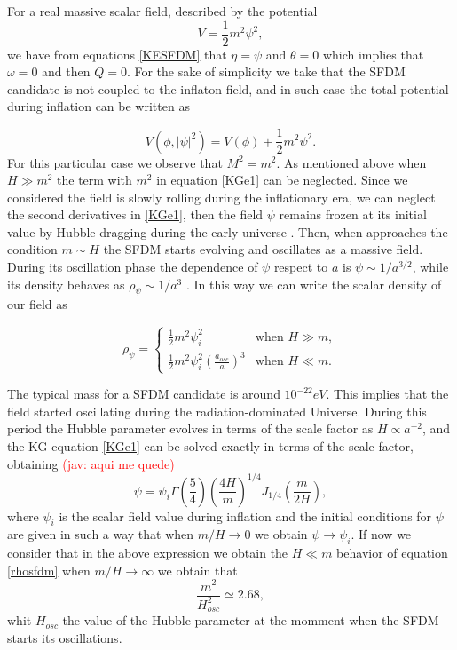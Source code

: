 \documentclass[amssymb,twocolumn,prd,nofootinbib,showpacs]{revtex4-1}
\newcommand{\jav}[1]{\textcolor{red}{(jav: #1)}}
\begin{document}
For a real massive scalar field, described by the potential 
\begin{equation}
V = \frac{1}{2}m^2\psi^2,
\end{equation}
we have from equations \eqref{KESFDM} that $\eta=\psi$ and $\theta=0$ which implies that $\omega=0$ and then $Q = 0$. 
For the sake of simplicity we take that the SFDM candidate is not coupled to the inflaton field, and in such case 
the total potential during inflation can be written as 

\begin{equation}\label{potential_massive}
V(\phi,|\psi|^2)=V(\phi)+\frac{1}{2}m^2\psi^2.
\end{equation}
For this particular case we observe that  $M^2=m^2$. As mentioned above when $H\gg m^2$ the term with $m^2$ 
in equation \eqref{KGe1} can be neglected. Since we considered the field is slowly rolling during the inflationary era, 
we can neglect the second derivatives in \eqref{KGe1}, then the field $\psi$ remains frozen at its initial value by 
Hubble dragging during the early universe \cite{curvatonatractor}. 
%
Then, when approaches the condition $m\sim H$ the SFDM starts evolving and oscillates as a massive field. 
During its oscillation phase the dependence of $\psi$ respect to $a$ is $\psi\sim 1/a^{3/2}$, while its density 
behaves as $\rho_{\psi}\sim 1/a^3$  \cite{SFphi41,SFphi42}. In this way we can write the scalar density 
of our field as

\begin{equation}\label{rhosfdm}
\rho_\psi = \left\lbrace\begin{array}{ll}
\frac{1}{2}m^2\psi_i^2 & \text{when }H\gg m, \\
\frac{1}{2}m^2\psi_i^2\left(\frac{a_{osc}}{a}\right)^3 & \text{when }H\ll m.
\end{array}\right .
\end{equation}

The typical mass for a SFDM candidate is around $10^{-22} eV$. 
This implies that the field started oscillating during the radiation-dominated Universe. 
During this period the Hubble parameter evolves in terms of the scale factor as $H\propto a^{-2}$, 
and the KG equation \eqref{KGe1} can be solved exactly in terms of the scale factor,  obtaining
\jav{aqui me quede}
\begin{equation}
\psi = \psi_i\Gamma\left(\frac{5}{4}\right)\left(\frac{4H}{m}\right)^{1/4}J_{1/4}\left(\frac{m}{2H}\right),
\end{equation}
where $\psi_i$ is the scalar field value during inflation and the initial conditions for $\psi$ are given in 
such a way that when $m/H\rightarrow 0$ we obtain $\psi\rightarrow\psi_i$. If now we consider that in the above expression we obtain the $H\ll m$ behavior of equation \eqref{rhosfdm} when $m/H\rightarrow \infty$ we obtain that
\begin{equation}\label{m_osc}
\frac{m^2}{H_{osc}^2}\simeq 2.68,
\end{equation}
whit $H_{osc}$ the value of the Hubble parameter at the momment when the SFDM starts its oscillations.
\end{document}
